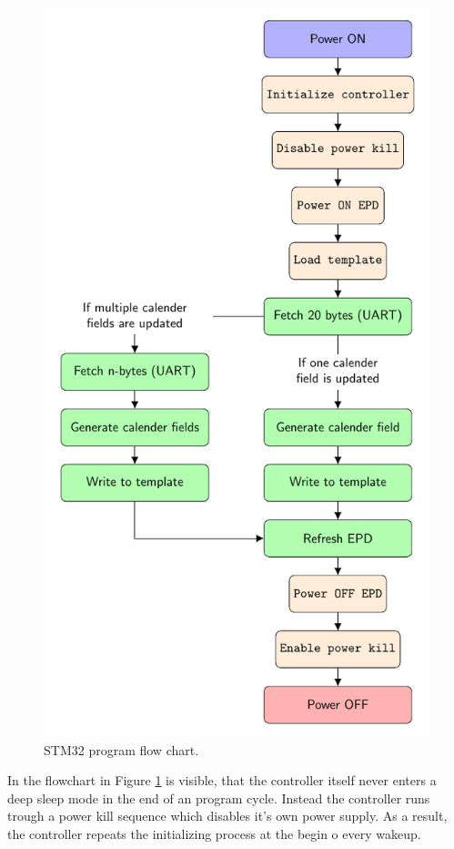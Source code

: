 \begin{figure}[ht]
	\centering
	\includegraphics[height=0.8\textheight]{4-development/software/graphics/main.pdf}
	\caption{STM32 program flow chart.\label{software:main}}
\end{figure}

In the flowchart in Figure \ref{software:main} is visible, that the controller itself never enters a deep sleep mode in the end of an program cycle. Instead the controller runs trough a power kill sequence which disables it's own power supply. As a result, the controller repeats the initializing process at the begin o every wakeup.

